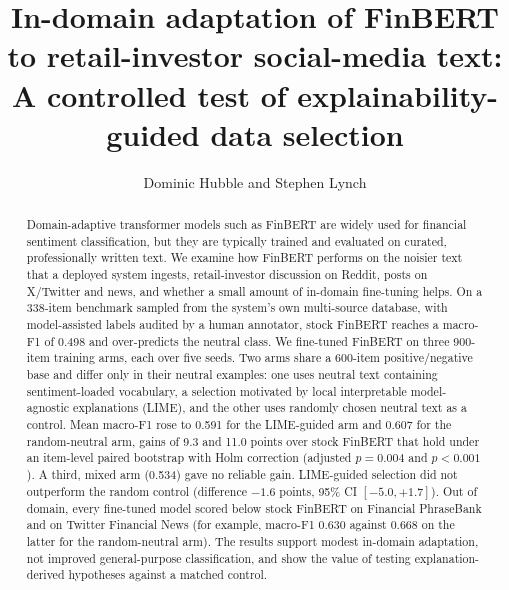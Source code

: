 \documentclass{aims}
\numberwithin{equation}{section}
\begin{document}
\title{In-domain adaptation of FinBERT to retail-investor social-media text: A controlled test of explainability-guided data selection}

\author{%
  Dominic Hubble
  and
  Stephen Lynch\corrauth
}


\address{%
  }


\begin{abstract}
Domain-adaptive transformer models such as FinBERT are widely used for financial
sentiment classification, but they are typically trained and evaluated on curated,
professionally written text. We examine how FinBERT performs on the noisier text
that a deployed system ingests, retail-investor discussion on Reddit, posts on
X/Twitter and news, and whether a small amount of in-domain fine-tuning helps. On a
338-item benchmark sampled from the system's own multi-source database, with
model-assisted labels audited by a human annotator, stock FinBERT reaches a
macro-F1 of 0.498 and over-predicts the neutral class. We fine-tuned FinBERT on
three 900-item training arms, each over five seeds. Two arms share a 600-item
positive/negative base and differ only in their neutral examples: one uses neutral
text containing sentiment-loaded vocabulary, a selection motivated by local
interpretable model-agnostic explanations (LIME), and the other uses randomly
chosen neutral text as a control. Mean macro-F1 rose to 0.591 for the LIME-guided
arm and 0.607 for the random-neutral arm, gains of 9.3 and 11.0 points over stock
FinBERT that hold under an item-level paired bootstrap with Holm correction
(adjusted $p = 0.004$ and $p < 0.001$). A third, mixed arm (0.534) gave no reliable
gain. LIME-guided selection did not outperform the random control (difference
$-1.6$ points, 95\% CI $[-5.0, +1.7]$). Out of domain, every fine-tuned model scored
below stock FinBERT on Financial PhraseBank and on Twitter Financial News (for
example, macro-F1 0.630 against 0.668 on the latter for the random-neutral arm). The
results support modest in-domain adaptation, not improved general-purpose
classification, and show the value of testing explanation-derived hypotheses
against a matched control.
\end{abstract}
\end{document}
